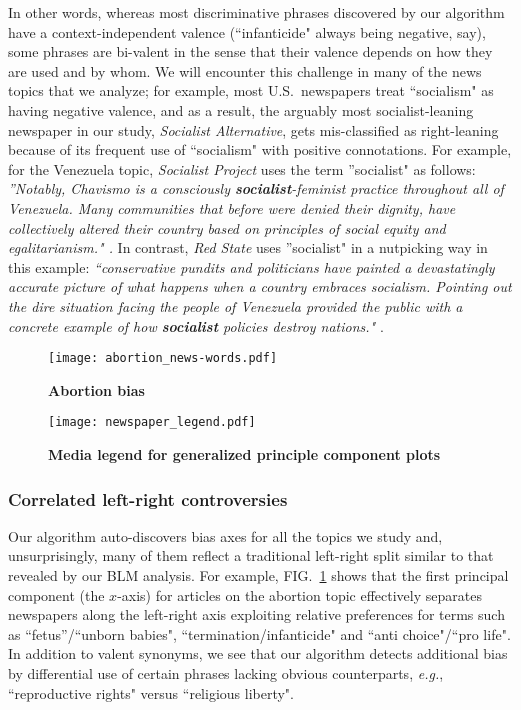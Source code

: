\documentclass[10pt,letterpaper]{article}
\def\eg{{\frenchspacing\it e.g.}}
\def\fig#1{FIG.~\ref{#1}}
\begin{document}
In other words, whereas most discriminative phrases discovered by our algorithm have a context-independent valence (``infanticide" always being negative, say), some phrases are bi-valent in the sense that their valence depends on how they are used and by whom.
We will encounter this challenge in many of the news topics that we analyze; for example, most U.S.~newspapers treat ``socialism" as having negative valence, and as a result, the arguably most socialist-leaning newspaper in our study, {\it Socialist Alternative}, gets mis-classified as right-leaning because of its frequent use of ``socialism" with positive connotations. For example, for the Venezuela topic, 
{\it Socialist Project} uses the term ''socialist" as follows:  {\it ''Notably, Chavismo is a consciously \textbf{socialist}-feminist practice throughout all of Venezuela. Many communities that before were denied their dignity, have collectively altered their country based on principles of social equity and egalitarianism." \cite{noauthor_defiant_2019}.} 
In contrast,  {\it Red State} uses ''socialist" in a nutpicking way in this example: {\it ``conservative pundits and politicians have painted a devastatingly accurate picture of what happens when a country embraces socialism. Pointing out the dire situation facing the people of Venezuela provided the public with a concrete example of how \textbf{socialist} policies destroy nations."} \cite{charles_selling_nodate}. 


\begin{figure}[tb]
\caption{{\bf Abortion bias}}
\hglue-5.89cm\texttt{[image: abortion\_news-words.pdf]}
\vskip-2cm
\label{abortionFig}
\end{figure}

\begin{figure}[tb]
\caption{{\bf Media legend for generalized principle component plots}}
\hglue-5.7cm\texttt{[image: newspaper\_legend.pdf]}
\label{legend}
\end{figure}

\clearpage


\subsubsection*{Correlated left-right controversies}

Our algorithm auto-discovers bias axes for all the topics we study and, unsurprisingly, many of them reflect a traditional left-right split similar to that revealed by our BLM analysis. For example, \fig{abortionFig} shows that the first principal component (the $x$-axis) for articles on the abortion topic effectively separates newspapers along the left-right axis exploiting relative preferences for terms such as ``fetus''/``unborn babies", ``termination/infanticide" and ``anti choice"/``pro life". 
In addition to valent synonyms, we see that our algorithm detects additional 
bias by differential use of certain phrases lacking obvious counterparts, \eg, 
``reproductive rights" versus ``religious liberty".
\end{document}
